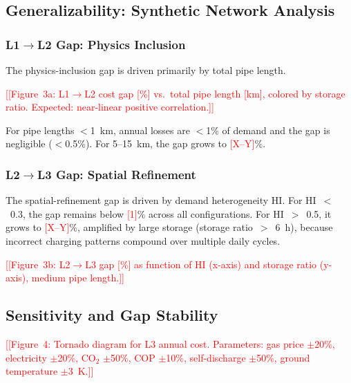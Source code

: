 \documentclass[review,3p]{elsarticle}
\newcommand{\placeholder}[1]{\textcolor{red}{[#1]}}
\begin{document}
\subsection{Generalizability: Synthetic Network Analysis}
\label{sec:results_generalizability}

\subsubsection{L1$\rightarrow$L2 Gap: Physics Inclusion}

The physics-inclusion gap is driven primarily by total pipe length.

\placeholder{[Figure~3a: L1$\rightarrow$L2 cost gap [\%] vs.\ total
pipe length [km], colored by storage ratio. Expected: near-linear
positive correlation.]}

For pipe lengths $<$1~km, annual losses are $<$1\% of demand and
the gap is negligible ($<$0.5\%). For 5--15~km, the gap grows to
\placeholder{X--Y}\%.

\subsubsection{L2$\rightarrow$L3 Gap: Spatial Refinement}

The spatial-refinement gap is driven by demand heterogeneity HI. For
HI~$<$~0.3, the gap remains below \placeholder{1}\% across all
configurations. For HI~$>$~0.5, it grows to \placeholder{X--Y}\%,
amplified by large storage (storage ratio~$>$~6~h), because incorrect
charging patterns compound over multiple daily cycles.

\placeholder{[Figure~3b: L2$\rightarrow$L3 gap [\%] as function of
HI (x-axis) and storage ratio (y-axis), medium pipe length.]}

\subsection{Sensitivity and Gap Stability}
\label{sec:results_sensitivity}

\placeholder{[Figure~4: Tornado diagram for L3 annual cost. Parameters:
gas price $\pm$20\%, electricity $\pm$20\%, CO$_2$ $\pm$50\%,
COP $\pm$10\%, self-discharge $\pm$50\%, ground temperature $\pm$3~K.]}
\end{document}
